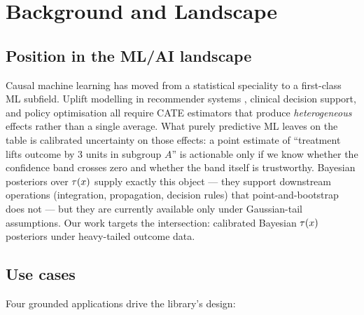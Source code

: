 \section{Background and Landscape}
\label{sec:background}

\subsection{Position in the ML/AI landscape}
Causal machine learning has moved from a statistical speciality to a
first-class ML subfield. Uplift modelling in recommender systems
\citep{wager2018estimation}, clinical decision support, and policy
optimisation all require CATE estimators that produce
\emph{heterogeneous} effects rather than a single average. What
purely predictive ML leaves on the table is calibrated uncertainty
on those effects: a point estimate of ``treatment lifts
outcome by 3 units in subgroup $A$'' is actionable only if we know
whether the confidence band crosses zero and whether the band itself
is trustworthy. Bayesian posteriors over $\tau(x)$ supply exactly this
object --- they support downstream operations (integration,
propagation, decision rules) that point-and-bootstrap does not ---
but they are currently available only under Gaussian-tail
assumptions. Our work targets the intersection: calibrated Bayesian
$\tau(x)$ posteriors under heavy-tailed outcome data.

\subsection{Use cases}
Four grounded applications drive the library's design:


